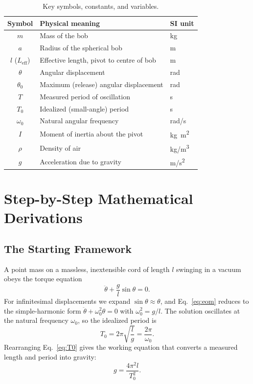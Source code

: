 \documentclass[11pt]{article}
\begin{document}
\begin{table}[h]
\centering
\caption{Key symbols, constants, and variables.}
\label{tab:symbols}
\begin{tabular}{cll}
\toprule
Symbol & Physical meaning & SI unit\\
\midrule
$m$        & Mass of the bob & \si{kg}\\
$a$        & Radius of the spherical bob & \si{m}\\
$l$ ($L_{\mathrm{eff}}$) & Effective length, pivot to centre of bob & \si{m}\\
$\theta$   & Angular displacement & \si{rad}\\
$\theta_0$ & Maximum (release) angular displacement & \si{rad}\\
$T$        & Measured period of oscillation & \si{s}\\
$T_0$      & Idealized (small-angle) period & \si{s}\\
$\omega_0$ & Natural angular frequency & \si{rad/s}\\
$I$        & Moment of inertia about the pivot & \si{kg.m^2}\\
$\rho$     & Density of air & \si{kg/m^3}\\
$g$        & Acceleration due to gravity & \si{m/s^2}\\
\bottomrule
\end{tabular}
\end{table}

\section{Step-by-Step Mathematical Derivations}

\subsection{The Starting Framework}

A point mass on a massless, inextensible cord of length $l$ swinging in a vacuum obeys
the torque equation
\begin{equation}
\ddot{\theta} + \frac{g}{l}\sin\theta = 0 .
\label{eq:eom}
\end{equation}
For infinitesimal displacements we expand $\sin\theta \approx \theta$, and
Eq.~\eqref{eq:eom} reduces to the simple-harmonic form $\ddot{\theta}+\omega_0^2\theta=0$
with $\omega_0^2 = g/l$. The solution oscillates at the natural frequency $\omega_0$, so
the idealized period is
\begin{equation}
T_0 = 2\pi\sqrt{\frac{l}{g}} = \frac{2\pi}{\omega_0}.
\label{eq:T0}
\end{equation}
Rearranging Eq.~\eqref{eq:T0} gives the working equation that converts a measured length
and period into gravity:
\begin{equation}
g = \frac{4\pi^2 l}{T_0^{2}}.
\label{eq:g}
\end{equation}
\end{document}
